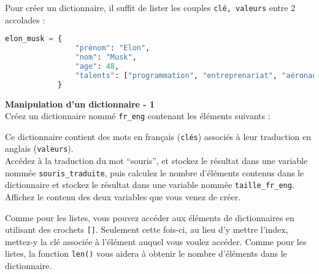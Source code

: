 	Pour créer un dictionnaire, il suffit de lister les couples \lstinline{clé, valeurs} entre 2 accolades : \\
	
	 \begin{lstlisting}[language=Python]
          elon_musk = {
                "prénom": "Elon",
                "nom": "Musk",
                "age": 48,
                "talents": ["programmation", "entreprenariat", "aéronautique"]
            }   \end{lstlisting}
				
	\begin{Exercice}[5 minutes] \textbf{Manipulation d'un dictionnaire - 1}\\
       Créez un dictionnaire nommé \lstinline{fr_eng} contenant les éléments suivants :
       
       
       
       Ce dictionnaire contient des mots en français (\lstinline{clés}) associés à leur traduction en anglais (\lstinline{valeurs}). \\
       
       Accédez à la traduction du mot ``souris'', et stockez le résultat dans une variable nommée \lstinline{souris_traduite}, puis calculez le nombre d'éléments contenus dans le dictionnaire et stockez le résultat dans une variable nommée \lstinline{taille_fr_eng}. Affichez le contenu des deux variables que vous venez de créer.
    
        \begin{conseil}
            Comme pour les listes, vous pouvez accéder aux éléments de dictionnaires en utilisant des crochets \lstinline{[]}. Seulement cette fois-ci, au lieu d'y mettre l'index, mettez-y la clé associée à l'élément auquel vous voulez accéder. Comme pour les listes, la fonction \lstinline{len()} vous aidera à obtenir le nombre d'éléments dans le dictionnaire.
        \end{conseil}
        
        \begin{solution}
             
        \end{solution}
    \end{Exercice}
    
